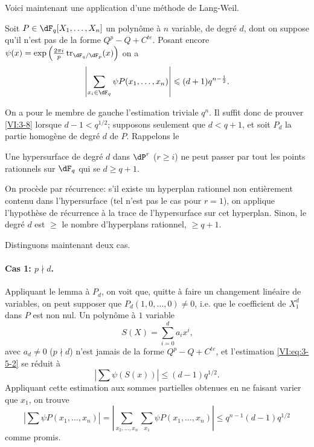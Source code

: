 Voici maintenant une application d'une m\'ethode de Lang-Weil. 





\begin{proposition_}\label{VI:3-8}
Soit $P\in \dF_q[X_1,\dots,X_n]$ un polyn\^ome \`a $n$ variable, de degr\'e 
$d$, dont on suppose qu'il n'est pas de la forme $Q^p-Q+C^{te}$. Posant encore 
$\psi(x) = \exp\left(\frac{2\pi i}{p} \tr_{\dF_q/\dF_p}(x)\right)$ on a 
\[
  \left|\sum_{x_i\in \dF_q} \psi P(x_1,\dots,x_n)\right| \leqslant (d+1) q^{n-\frac 1 2} \text{.}
\]
\end{proposition_}

On a pour le membre de gauche l'estimation triviale $q^n$. Il suffit donc de 
prouver \ref{VI:3-8} lorsque $d-1<q^{1/2}$; supposons seulement que 
$d<q+1$, et soit $P_d$ la partie homog\`ene de degr\'e $d$ de $P$. Rappelons le 





\begin{lemma_}\label{VI:3-9}
Une hypersurface de degr\'e $d$ dans $\dP^r$ ($r\geqslant i$) ne peut passer 
par tout les points rationnels sur $\dF_q$ qui se $d\geqslant q+1$. 
\end{lemma_}

On proc\`ede par r\'ecurrence: s'il existe un hyperplan rationnel non 
enti\`erement contenu dans l'hypersurface (tel n'est pas le cas pour $r=1$), on 
applique l'hypoth\`ese de r\'ecurrence \`a la trace de l'hypersurface sur cet 
hyperplan. Sinon, le degr\'e $d$ est $\geqslant$ le nombre d'hyperplans 
rationnel, $\geqslant q+1$. 

Distinguons maintenant deux cas. 


\paragraph{Cas 1: $p\nmid d$.}
Appliquant le lemma \`a $P_d$, on voit que, quitte \`a faire un changement 
lin\'eaire de variables, on peut supposer que $P_d(1,0,\ldots,0)\ne 0$, i.e. 
que le coefficient de $X_1^d$ dans $P$ est non nul. Un polyn\^ome \`a $1$ 
variable 
\[
  S(X) = \sum_{i=0}^d a_i x^i \text{,} 
\]
avec $a_d\ne 0$ ($p\nmid d$) n'est jamais de la forme $Q^p-Q+C^{t e}$, et 
l'estimation \eqref{VI:eq:3-5-2} se r\'eduit \`a 
\[
  \left| \sum \psi(S(x)) \right| \leqslant (d-1) q^{1/2} \text{.} 
\]
Appliquant cette estimation aux sommes partielles obtenues en ne faisant varier 
que $x_1$, on trouve 
\[
  \left| \sum \psi P(x_1,\dots,x_n) \right| = \left| \sum_{x_2,\dots,x_n} \sum_{x_1} \psi P(x_1,\dots,x_n)\right| \leqslant q^{n-1} (d-1) q^{1/2} 
\]
comme promis. 


